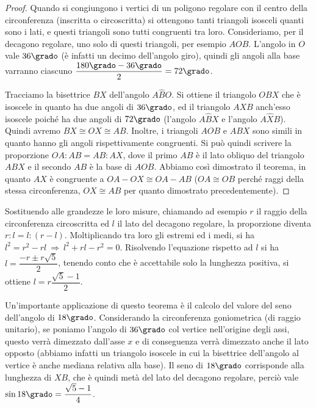 \begin{proof}
Quando si congiungono i vertici di un poligono regolare con il centro 
della circonferenza (inscritta o circoscritta) si ottengono tanti 
triangoli isosceli quanti sono i lati, e questi triangoli sono tutti 
congruenti tra loro.
Consideriamo, per il decagono regolare, uno solo di questi triangoli, 
per esempio \(AOB\). L'angolo in \(O\) vale \(36\grado\) (è infatti un 
decimo dell'angolo giro), quindi gli angoli alla base varranno 
ciascuno \(\dfrac{180\grado-36\grado}{2} = 72\grado\).

Tracciamo la bisettrice \(BX\) dell'angolo \(A\widehat{B}O\). Si ottiene 
il triangolo \(OBX\) che è isoscele in quanto ha due angoli di 
\(36\grado\), ed il triangolo \(AXB\) anch'esso isoscele poiché ha due 
angoli di \(72\grado\) (l'angolo \(A\widehat{B}X\) e l'angolo 
\(A\widehat{X}B\)).  
Quindi avremo \(BX\cong OX\cong AB\).
Inoltre, i triangoli \(AOB\) e \(ABX\) sono simili in quanto hanno gli 
angoli rispettivamente congruenti.
Si può quindi scrivere la proporzione \(OA:AB=AB:AX\), dove il primo 
\(AB\) è il lato obliquo del triangolo \(ABX\) e il secondo \(AB\) è la 
base di \(AOB\).
Abbiamo così dimostrato il teorema, in quanto \(AX\) è congruente a 
\(OA-OX \cong OA-AB\) (\(OA\cong OB\) perché raggi della stessa 
circonferenza, \(OX\cong AB\) per quanto dimostrato precedentemente).
\end{proof}

Sostituendo alle grandezze le loro misure, chiamando ad esempio \(r\) 
il raggio della circonferenza circoscritta ed \(l\) il lato del 
decagono regolare, la proporzione diventa \(r:l=l:(r-l)\).
Moltiplicando tra loro gli estremi ed i medi, si ha \(l^2=r^2-rl 
\:\Rightarrow\: l^2+rl-r^2=0\).
Risolvendo l'equazione rispetto ad \(l\) si ha \(l=\dfrac{-r\pm 
r\sqrt{5}}{2}\), tenendo conto che è accettabile solo la lunghezza 
positiva, si ottiene \(l=r\dfrac{\sqrt{5}-1}{2}\).

\begin{wrapfigure}{r}{0.35\textwidth}
	\centering
\end{wrapfigure}
Un'importante applicazione di questo teorema è il calcolo del valore 
del seno dell'angolo di \(18\grado\).
Considerando la circonferenza goniometrica (di raggio unitario), se 
poniamo l'angolo di \(36\grado\) col vertice nell'origine degli assi, 
questo verrà dimezzato dall'asse \(x\) e di conseguenza verrà dimezzato 
anche il lato opposto (abbiamo infatti un triangolo isoscele in cui 
la bisettrice dell'angolo al vertice è anche mediana relativa alla 
base).
Il seno di \(18\grado\) corrisponde alla lunghezza di \(XB\), che è 
quindi metà del lato del decagono regolare, perciò vale \(\sin 18\grado 
= \dfrac{\sqrt{5}-1}{4}\).

% 
% 
% 
